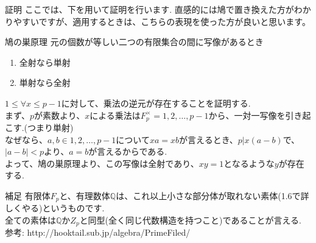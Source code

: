 \documentclass[dvipdfmx,11pt,notheorems]{beamer}
\begin{document}
\begin{frame}{証明}
  ここでは、下を用いて証明を行います. 直感的には鳩で置き換えた方がわかりやすいですが、適用するときは、こちらの表現を使った方が良いと思います。
  \begin{alertblock}{鳩の巣原理}
    元の個数が等しい二つの有限集合の間に写像があるとき
    \begin{enumerate}
      \item 全射なら単射
      \item 単射なら全射
    \end{enumerate}
  \end{alertblock}
  $1 \le \forall x \le p-1$に対して、乗法の逆元が存在することを証明する.\\
  まず、$p$が素数より、$x$による乗法は$F_p^\times = {1,2,\ldots,p-1}$から、一対一写像を引き起こす.(つまり単射)\\
  なぜなら、$a,b\in {1,2,\ldots,p-1}$について$xa=xb$が言えるとき、$p|x(a-b)$で、$|a-b|<p$より、$a=b$が言えるからである.\\

  よって、鳩の巣原理より、この写像は全射であり、$xy=1$となるような$y$が存在する.
\end{frame}
\begin{frame}{補足}
  有限体$F_p$と、有理数体$\mathbb{Q}$は、これ以上小さな部分体が取れない\alert{素体}(1.6で詳しくやる)というものです.\\
  全ての素体は$\mathbb{Q}$か$Z_p$と同型(全く同じ代数構造を持つこと)であることが言える.\\
  参考: http://hooktail.sub.jp/algebra/PrimeFiled/
\end{frame}
\end{document}
